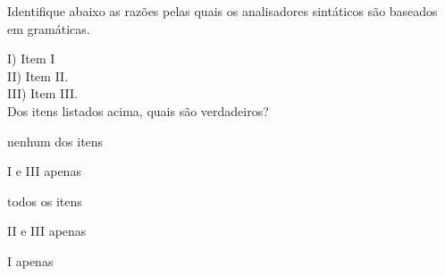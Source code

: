 \question[10]

Identifique abaixo as razões pelas quais os analisadores sintáticos são
baseados em gramáticas.

I) Item I\\
II) Item II.\\
III) Item III.\\

Dos itens listados acima, quais são verdadeiros?\\

\begin{choices}
\item nenhum dos itens
\item I e III apenas
\item todos os itens %
\item II e III apenas
\item I apenas
\end{choices}
\answerline


